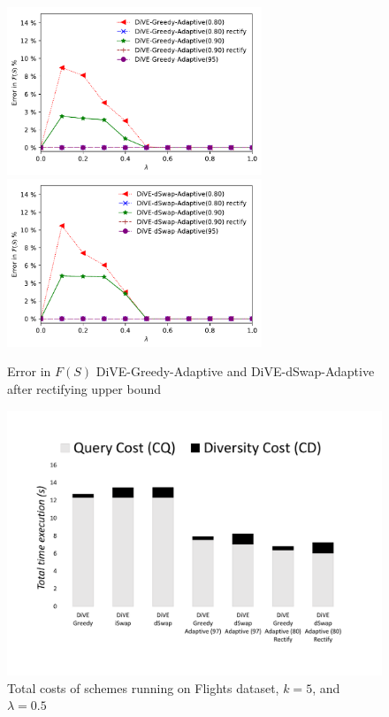 \documentclass{article}
\begin{document}
\begin{figure}
	\begin{center}
		\includegraphics[width=3.0in]{figures/error_fs_rectifying_greedy}
		\includegraphics[width=3.0in]{figures/error_fs_rectifying_dswap}
		\caption{Error in $F(S)$ DiVE-Greedy-Adaptive and DiVE-dSwap-Adaptive after rectifying upper bound}
		\label{fig:error_fs_rectifying}
	\end{center}
\end{figure}





\begin{figure}
	\begin{center}
		\vspace{-150pt}
		\includegraphics[width=6.5in]{figures/flight_costs_rectifying}
		\caption{Total costs of schemes running on Flights dataset, $k = 5$, and $\lambda = 0.5$ }
		\label{fig:flight_costs_all_rectifying}
		\vspace{-10pt}
	\end{center}
\end{figure}
\end{document}
